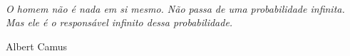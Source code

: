 %
%

\

\vfill

\begin{flushright}
\begin{minipage}{.5\textwidth}
	\textit{O homem não é nada em si mesmo. Não passa de uma probabilidade infinita. Mas ele é o responsável infinito dessa probabilidade.}\\
    \begin{flushright}
	  Albert Camus
    \end{flushright}
\end{minipage}
\end{flushright}

\vspace*{1cm}
\newpage
